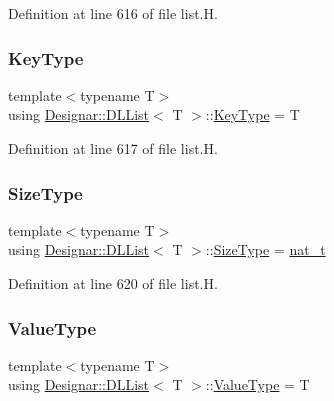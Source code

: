 Definition at line 616 of file list.\+H.

\mbox{\label{class_designar_1_1_d_l_list_ac27702ab24c52fa9d770abc3c455bb25}} 
\subsubsection{\texorpdfstring{Key\+Type}{KeyType}}
{\footnotesize\ttfamily template$<$typename T$>$ \\
using \hyperlink{class_designar_1_1_d_l_list}{Designar\+::\+D\+L\+List}$<$ T $>$\+::\hyperlink{class_designar_1_1_d_l_list_ac27702ab24c52fa9d770abc3c455bb25}{Key\+Type} =  T}



Definition at line 617 of file list.\+H.

\mbox{\label{class_designar_1_1_d_l_list_ac03520f15d4db4a31f8764ed5633e0c6}} 
\subsubsection{\texorpdfstring{Size\+Type}{SizeType}}
{\footnotesize\ttfamily template$<$typename T$>$ \\
using \hyperlink{class_designar_1_1_d_l_list}{Designar\+::\+D\+L\+List}$<$ T $>$\+::\hyperlink{class_designar_1_1_d_l_list_ac03520f15d4db4a31f8764ed5633e0c6}{Size\+Type} =  \hyperlink{namespace_designar_aa72662848b9f4815e7bf31a7cf3e33d1}{nat\+\_\+t}}



Definition at line 620 of file list.\+H.

\mbox{\label{class_designar_1_1_d_l_list_a839e4da136d61d24ba8f14fb4d9ceb34}} 
\subsubsection{\texorpdfstring{Value\+Type}{ValueType}}
{\footnotesize\ttfamily template$<$typename T$>$ \\
using \hyperlink{class_designar_1_1_d_l_list}{Designar\+::\+D\+L\+List}$<$ T $>$\+::\hyperlink{class_designar_1_1_d_l_list_a839e4da136d61d24ba8f14fb4d9ceb34}{Value\+Type} =  T}



